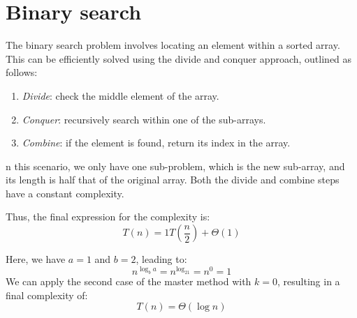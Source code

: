 \section{Binary search}

The binary search problem involves locating an element within a sorted array. 
This can be efficiently solved using the divide and conquer approach, outlined as follows:
\begin{enumerate}
    \item \textit{Divide}: check the middle element of the array.
    \item \textit{Conquer}: recursively search within one of the sub-arrays.
    \item \textit{Combine}: if the element is found, return its index in the array.
\end{enumerate}
n this scenario, we only have one sub-problem, which is the new sub-array, and its length is half that of the original array.
Both the divide and combine steps have a constant complexity.

Thus, the final expression for the complexity is:
\[T(n)=1T\left(\dfrac{n}{2}\right)+\Theta(1)\]

Here, we have $a=1$ and $b=2$, leading to:
\[n^{\log_ba}=n^{\log_21}=n^0=1\]
We can apply the second case of the master method with $k=0$, resulting in a final complexity of:
\[T(n)=\Theta(\log n)\]